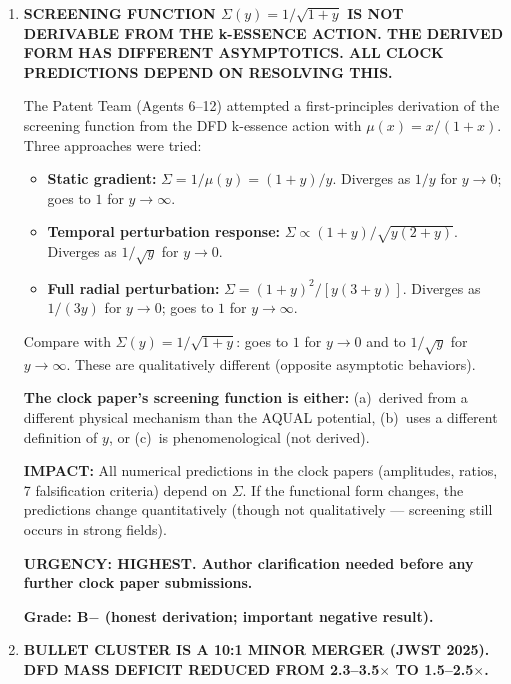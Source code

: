 \documentclass[11pt]{article}
\begin{document}
\begin{tcolorbox}[colback=blue!5!white, colframe=blue!70!black,
  title=\textbf{W4i23 TOP 5 FINDINGS (RANKED BY IMPACT)}]

\begin{enumerate}[label=\textbf{F\arabic*.}]

\item \textbf{SCREENING FUNCTION $\Sigma(y) = 1/\sqrt{1+y}$ IS NOT
  DERIVABLE FROM THE k-ESSENCE ACTION.  THE DERIVED FORM HAS DIFFERENT
  ASYMPTOTICS.  ALL CLOCK PREDICTIONS DEPEND ON RESOLVING THIS.}

  The Patent Team (Agents 6--12) attempted a first-principles derivation
  of the screening function from the DFD k-essence action with
  $\mu(x) = x/(1+x)$.  Three approaches were tried:

  \begin{itemize}
  \item \textbf{Static gradient:}  $\Sigma = 1/\mu(y) = (1+y)/y$.
    Diverges as $1/y$ for $y \to 0$; goes to $1$ for $y \to \infty$.
  \item \textbf{Temporal perturbation response:}  $\Sigma \propto
    (1+y)/\sqrt{y(2+y)}$.  Diverges as $1/\sqrt{y}$ for $y \to 0$.
  \item \textbf{Full radial perturbation:}  $\Sigma = (1+y)^2/[y(3+y)]$.
    Diverges as $1/(3y)$ for $y \to 0$; goes to $1$ for $y \to \infty$.
  \end{itemize}

  Compare with $\Sigma(y) = 1/\sqrt{1+y}$: goes to $1$ for $y \to 0$
  and to $1/\sqrt{y}$ for $y \to \infty$.  These are qualitatively
  different (opposite asymptotic behaviors).

  \textbf{The clock paper's screening function is either:}
  (a)~derived from a different physical mechanism than the AQUAL
  potential, (b)~uses a different definition of $y$, or
  (c)~is phenomenological (not derived).

  \textbf{IMPACT:}  All numerical predictions in the clock papers
  (amplitudes, ratios, 7 falsification criteria) depend on $\Sigma$.
  If the functional form changes, the predictions change quantitatively
  (though not qualitatively --- screening still occurs in strong fields).

  \textbf{URGENCY: HIGHEST.  Author clarification needed before any
  further clock paper submissions.}

  \textbf{Grade: B$-$ (honest derivation; important negative result).}

\item \textbf{BULLET CLUSTER IS A 10:1 MINOR MERGER (JWST 2025).
  DFD MASS DEFICIT REDUCED FROM 2.3--3.5$\times$ TO 1.5--2.5$\times$.}


\end{enumerate}
\end{tcolorbox}
\end{document}
